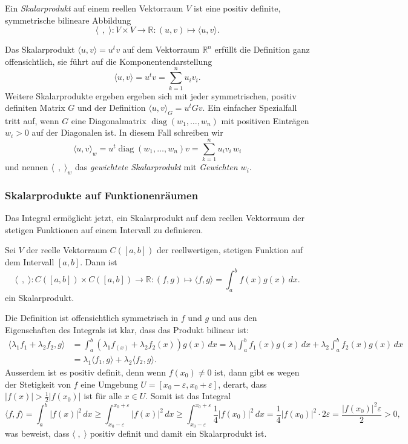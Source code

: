 \begin{definition}
Ein {\em Skalarprodukt} auf einem reellen Vektorraum $V$ ist eine
positiv definite, symmetrische bilineare Abbildung
\[
\langle\;\,,\;\rangle
\colon
V\times V
\to
\mathbb{R}
:
(u,v) \mapsto \langle u,v\rangle.
\]
\end{definition}

Das Skalarprodukt $\langle u,v\rangle=u^tv$ auf dem Vektorraum 
$\mathbb{R}^n$ erfüllt die Definition ganz offensichtlich,
sie führt auf die Komponentendarstellung
\[
\langle u,v\rangle = u^tv = \sum_{k=1}^n u_iv_i.
\]
Weitere Skalarprodukte ergeben ergeben sich mit jeder symmetrischen,
positiv definiten Matrix $G$ und der Definition
$\langle u,v\rangle_G=u^tGv$.
Ein einfacher Spezialfall tritt auf, wenn $G$ eine Diagonalmatrix
$\operatorname{diag}(w_1,\dots,w_n)$
mit positiven Einträgen $w_i>0$ auf der Diagonalen ist.
In diesem Fall schreiben wir
\[
\langle u,v\rangle_w
=
u^t\operatorname{diag}(w_1,\dots,w_n)v
=
\sum_{k=1}^n u_iv_i\,w_i
\]
und nennen $\langle \;\,,\;\rangle_w$ das {\em gewichtete Skalarprodukt}
mit {\em Gewichten $w_i$}.

\subsubsection{Skalarprodukte auf Funktionenräumen}
Das Integral ermöglicht jetzt, ein Skalarprodukt auf dem reellen
Vektorraum der stetigen Funktionen auf einem Intervall zu definieren.

\begin{definition}
Sei $V$ der reelle Vektorraum $C([a,b])$ der reellwertigen, stetigen
Funktion auf dem Intervall $[a,b]$.
Dann ist 
\[
\langle\;\,,\;\rangle
\colon
C([a,b]) \times C([a,b]) \to \mathbb{R}
:
(f,g) \mapsto \langle f,g\rangle = \int_a^b f(x)g(x)\,dx.
\]
ein Skalarprodukt.
\end{definition}

Die Definition ist offensichtlich symmetrisch in $f$ und $g$ und
aus den Eigenschaften des Integrals ist klar, dass das Produkt
bilinear ist:
\begin{align*}
\langle \lambda_1 f_1+\lambda_2f_2,g\rangle
&=
\int_a^b (\lambda_1f_(x) +\lambda_2f_2(x))g(x)\,dx
=
\lambda_1\int_a^b f_1(x) g(x)\,dx
+
\lambda_2\int_a^b f_2(x) g(x)\,dx
\\
&=
\lambda_1\langle f_1,g\rangle
+
\lambda_2\langle f_2,g\rangle.
\end{align*}
Ausserdem ist es positiv definit, denn wenn $f(x_0) \ne 0$ ist,
dann gibt es wegen der Stetigkeit von $f$ eine Umgebung
$U=[x_0-\varepsilon,x_0+\varepsilon]$, derart, dass $|f(x)| > \frac12|f(x_0)|$
ist für alle $x\in U$.
Somit ist das Integral
\[
\langle f,f\rangle
=
\int_a^b |f(x)|^2\,dx
\ge
\int_{x_0-\varepsilon}^{x_0+\varepsilon} |f(x)|^2\,dx
\ge
\int_{x_0-\varepsilon}^{x_0+\varepsilon} \frac14|f(x_0)|^2\,dx
=
\frac{1}{4}|f(x_0)|^2\cdot 2\varepsilon
=
\frac{|f(x_0)|^2\varepsilon}{2}
>0,
\]
was beweist, dass $\langle\;,\;\rangle$ positiv definit und damit
ein Skalarprodukt ist.

